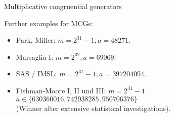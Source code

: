 \documentclass[11pt,compress,t,notes=noshow, xcolor=table]{beamer}
\begin{document}
\begin{vbframe}{Multiplicative congruential generators}
\framebreak

Further examples for MCGs:
\begin{itemize}
 \item Park, Miller:  $m = 2^{31} - 1, a = 48271$.
 \item Marsaglia I:  $m = 2^{32}, a = 69069$.
 \item SAS / IMSL:  $m = 2^{31} - 1, a = 397204094$.
 \item Fishman-Moore I, II und III:   $m = 2^{31} - 1$\\
 $a \in \{630360016, 742938285, 950706376 \}$ \\
 (Winner after extensive statistical investigations).
\end{itemize}
\end{vbframe}


\endlecture
\end{document}
